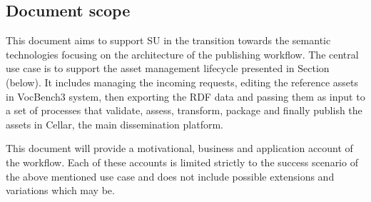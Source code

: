 	\subsection{Document scope}
	\label{sec:scope}
	
	This document aims to support SU in the transition towards the semantic technologies focusing on the architecture of the publishing workflow. 
	The central use case is to support the asset management lifecycle presented in Section (below). It includes managing the incoming requests, editing the reference assets in VocBench3 system, then exporting the RDF data and passing them as input to a set of processes that validate, assess, transform, package and finally publish the assets in Cellar, the main dissemination platform.
	
	This document will provide a motivational, business and application account of the workflow. Each of these accounts is limited strictly to the success scenario of the above mentioned use case and does not include possible extensions and variations which may be. 
	
